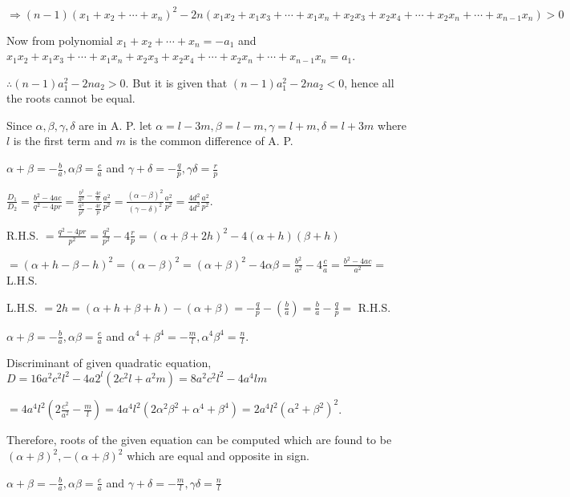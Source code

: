   $\Rightarrow (n - 1)(x_1 + x_2 + \cdots + x_n)^2 - 2n(x_1x_2 + x_1x_3 + \cdots + x_1x_n + x_2x_3 +
  x_2x_4 + \cdots + x_2x_n + \cdots + x_{n - 1}x_n) > 0$

  Now from polynomial $x_1 + x_2 + \cdots + x_n = -a_1$ and $x_1x_2 + x_1x_3 + \cdots + x_1x_n + x_2x_3 +
  x_2x_4 + \cdots + x_2x_n + \cdots + x_{n - 1}x_n = a_1$.

  $\therefore (n - 1)a_1^2 - 2na_2 > 0$. But it is given that $(n - 1)a_1^2 - 2na_2 < 0$, hence all the
  roots cannot be equal.
\item Since $\alpha, \beta, \gamma, \delta$ are in A. P. let $\alpha = l - 3m, \beta = l - m, \gamma = l +
  m, \delta = l + 3m$ where $l$ is the first term and $m$ is the common difference of A. P.

  $\alpha + \beta = -\frac{b}{a}, \alpha\beta = \frac{c}{a}$ and $\gamma + \delta = -\frac{q}{p},
  \gamma\delta = \frac{r}{p}$

  $\frac{D_1}{D_2} = \frac{b^2 - 4ac}{q^2 - 4pr} = \frac{\frac{b^2}{a^2} - \frac{4c}{a}}{\frac{a^2}{p^2} -
    \frac{4r}{p}}\frac{a^2}{p^2}= \frac{(\alpha - \beta)^2}{(\gamma - \delta)^2}\frac{a^2}{p^2} =
  \frac{4d^2}{4d^2}\frac{a^2}{p^2}$.
\item R.H.S. $= \frac{q^2 - 4pr}{p^2} = \frac{q^2}{p^2} - 4\frac{r}{p} = (\alpha + \beta + 2h)^2 - 4(\alpha
  + h)(\beta + h)$

  $= (\alpha + h - \beta - h)^2 = (\alpha - \beta)^2 = (\alpha + \beta)^2 - 4\alpha\beta = \frac{b^2}{a^2} -
  4\frac{c}{a} = \frac{b^2 - 4ac}{a^2} =$ L.H.S.
\item L.H.S. $= 2h = (\alpha + h + \beta + h) - (\alpha + \beta) = -\frac{q}{p} -(\frac{b}{a}) = \frac{b}{a}
  - \frac{q}{p} =$ R.H.S.
\item $\alpha + \beta = -\frac{b}{a}, \alpha\beta = \frac{c}{a}$ and $\alpha^4 + \beta^4 = -\frac{m}{l},
  \alpha^4\beta^4 = \frac{n}{l}$.

  Discriminant of given quadratic equation, $D = 16a^2c^2l^2 - 4a2^l(2c^2l + a^2m) = 8a^2c^2l^2 - 4a^4lm$

  $= 4a^4l^2\left(2\frac{c^2}{a^2} - \frac{m}{l}\right)= 4a^4l^2(2\alpha^2\beta^2 + \alpha^4 + \beta^4) =
  2a^4l^2(\alpha^2 + \beta^2)^2$.

  Therefore, roots of the given equation can be computed which are found to be $(\alpha + \beta)^2, -(\alpha
  + \beta)^2$ which are equal and opposite in sign.
\item $\alpha + \beta = -\frac{b}{a}, \alpha\beta = \frac{c}{a}$ and $\gamma + \delta = -\frac{m}{l},
  \gamma\delta = \frac{n}{l}$

